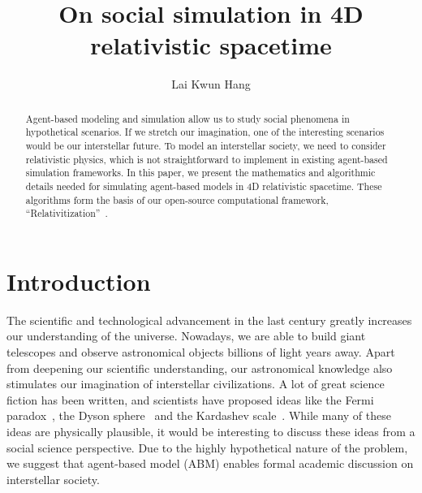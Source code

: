 \documentclass{svproc}
\begin{document}
\mainmatter              %
%
\title{On social simulation in 4D relativistic spacetime}
%
%
\author{Lai Kwun Hang}
%
%
%

\maketitle              %

\begin{abstract}
Agent-based modeling and simulation allow us to study social phenomena in hypothetical scenarios.
If we stretch our imagination, one of the interesting scenarios would be our interstellar future.
To model an interstellar society, we need to consider relativistic physics,
which is not straightforward to implement in existing agent-based simulation frameworks.
In this paper, we present the mathematics and algorithmic details needed for simulating agent-based models in 4D relativistic spacetime.
These algorithms form the basis of our open-source computational framework, ``Relativitization''~\cite{relativitization}.
\end{abstract}

\section{Introduction}
The scientific and technological advancement in the last century greatly increases our understanding of the universe.
Nowadays, we are able to build giant telescopes and observe astronomical objects billions of light years away.
Apart from deepening our scientific understanding, our astronomical knowledge also stimulates our imagination
of interstellar civilizations.
A lot of great science fiction has been written, and scientists have proposed ideas like 
the Fermi paradox~\cite{gray2015fermi}, the Dyson sphere~\cite{wright2020dyson} and the Kardashev scale~\cite{gray2020extended}.
While many of these ideas are physically plausible, 
it would be interesting to discuss these ideas from a social science perspective.
Due to the highly hypothetical nature of the problem,
we suggest that agent-based model (ABM) enables formal academic discussion on interstellar society.
\end{document}
